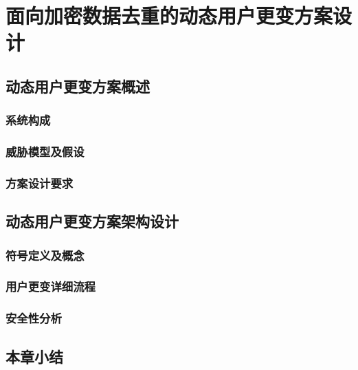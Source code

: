 \chapter{面向加密数据去重的动态用户更变方案设计}

\section{动态用户更变方案概述}

\subsection{系统构成}

\subsection{威胁模型及假设}

\subsection{方案设计要求}

\section{动态用户更变方案架构设计}

\subsection{符号定义及概念}

\subsection{用户更变详细流程}

\subsection{安全性分析}

\section{本章小结}

\endinput